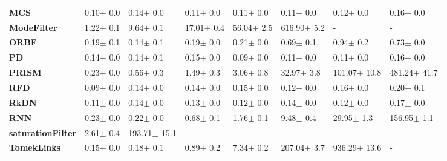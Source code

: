 \begin{tabular}{llllllll}
\textbf{MCS             } &   0.10$\pm$ 0.0 &     0.14$\pm$ 0.0 &      0.11$\pm$ 0.0 &    0.11$\pm$ 0.0 &     0.11$\pm$ 0.0 &     0.12$\pm$ 0.0 &     0.16$\pm$ 0.0 \\
\textbf{ModeFilter      } &   1.22$\pm$ 0.1 &     9.64$\pm$ 0.1 &     17.01$\pm$ 0.4 &   56.04$\pm$ 2.5 &   616.90$\pm$ 5.2 &                 - &                 - \\
\textbf{ORBF            } &   0.19$\pm$ 0.1 &     0.14$\pm$ 0.1 &      0.19$\pm$ 0.0 &    0.21$\pm$ 0.0 &     0.69$\pm$ 0.1 &     0.94$\pm$ 0.2 &     0.73$\pm$ 0.0 \\
\textbf{PD              } &   0.14$\pm$ 0.0 &     0.14$\pm$ 0.1 &      0.15$\pm$ 0.0 &    0.09$\pm$ 0.0 &     0.11$\pm$ 0.0 &     0.11$\pm$ 0.0 &     0.16$\pm$ 0.0 \\
\textbf{PRISM           } &   0.23$\pm$ 0.0 &     0.56$\pm$ 0.3 &      1.49$\pm$ 0.3 &    3.06$\pm$ 0.8 &    32.97$\pm$ 3.8 &  101.07$\pm$ 10.8 &  481.24$\pm$ 41.7 \\
\textbf{RFD             } &   0.09$\pm$ 0.0 &     0.14$\pm$ 0.0 &      0.14$\pm$ 0.0 &    0.15$\pm$ 0.0 &     0.12$\pm$ 0.0 &     0.16$\pm$ 0.0 &     0.20$\pm$ 0.1 \\
\textbf{RkDN            } &   0.11$\pm$ 0.0 &     0.14$\pm$ 0.0 &      0.13$\pm$ 0.0 &    0.12$\pm$ 0.0 &     0.14$\pm$ 0.0 &     0.12$\pm$ 0.0 &     0.17$\pm$ 0.0 \\
\textbf{RNN             } &   0.23$\pm$ 0.0 &     0.22$\pm$ 0.0 &      0.68$\pm$ 0.1 &    1.76$\pm$ 0.1 &     9.48$\pm$ 0.4 &    29.95$\pm$ 1.3 &   156.95$\pm$ 1.1 \\
\textbf{saturationFilter} &   2.61$\pm$ 0.4 &  193.71$\pm$ 15.1 &                  - &                - &                 - &                 - &                 - \\
\textbf{TomekLinks      } &   0.15$\pm$ 0.0 &     0.18$\pm$ 0.1 &      0.89$\pm$ 0.2 &    7.34$\pm$ 0.2 &   207.04$\pm$ 3.7 &  936.29$\pm$ 13.6 &                 - \\
\bottomrule
\end{tabular}
